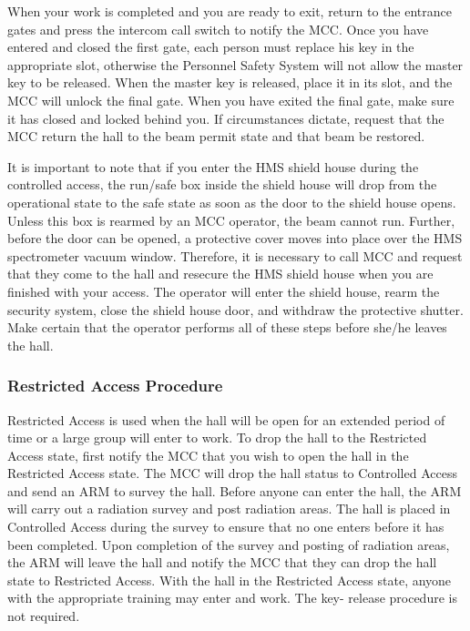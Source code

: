 When your work is completed and you are ready to exit, return to the
entrance gates and press the intercom call switch to notify the
MCC. Once you have entered and closed the first gate, each person must
replace his key in the appropriate slot, otherwise the Personnel
Safety System will not allow the master key to be released. When the
master key is released, place it in its slot, and the MCC will unlock
the final gate. When you have exited the final gate, make sure it has
closed and locked behind you. If circumstances dictate, request that
the MCC return the hall to the beam permit state and that beam be
restored.

It is important to note that if you enter the HMS shield house during
the controlled access, the run/safe box inside the shield house will
drop from the operational state to the safe state as soon as the door
to the shield house opens. Unless this box is rearmed by an MCC
operator, the beam cannot run.  Further, before the door can be
opened, a protective cover moves into place over the HMS spectrometer
vacuum window.  Therefore, it is necessary to call MCC and request
that they come to the hall and resecure the HMS shield house when you
are finished with your access.  The operator will enter the shield
house, rearm the security system, close the shield house door, and
withdraw the protective shutter. Make certain that the operator
performs all of these steps before she/he leaves the hall.

\subsubsection{Restricted Access Procedure}
Restricted Access is used when the hall will be open for an extended
period of time or
a large group will enter to work. To drop the hall to the
Restricted Access state, first
notify the MCC that you wish to open the hall in the Restricted Access
state. The MCC will
drop the hall status to Controlled Access and send an ARM to survey the
hall. Before anyone
can enter the hall, the ARM will carry out a radiation survey and post
radiation areas.  The hall is
placed in Controlled Access during the survey to ensure that no one enters
before it has been
completed. Upon completion of the survey and posting of radiation areas,
the ARM will leave
the hall and notify the MCC that they can drop the hall state to Restricted
Access. With the hall
in the Restricted Access state, anyone with the appropriate training may
enter and work.  The
key- release procedure is not required.


